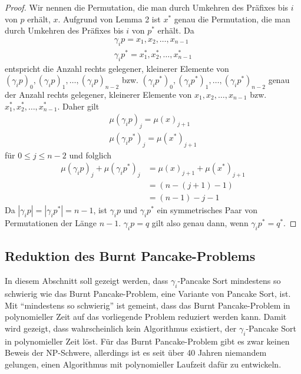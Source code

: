 \documentclass[a4paper, 10pt, ngerman]{article}
\begin{document}
\begin{proof}
    Wir nennen die Permutation, die man durch Umkehren des Präfixes bis $i$ von $p$ erhält, $x$. Aufgrund von Lemma 2 ist $x^*$ genau die Permutation, die man durch Umkehren des Präfixes bis $i$ von $p^*$ erhält.
    Da
    \begin{align*}
        \gamma_i p = x_1, x_2, \dots, x_{n-1} \\
        \gamma_i p^* = x^*_1, x^*_2, \dots, x^*_{n-1}
    \end{align*}
    entspricht die Anzahl rechts gelegener, kleinerer Elemente von $(\gamma_i p)_0, (\gamma_i p)_1, \dots, (\gamma_i p)_{n - 2}$ bzw. $(\gamma_i p^*)_0, (\gamma_i p^*)_1, \dots, (\gamma_i p^*)_{n - 2}$ genau der Anzahl rechts gelegener, kleinerer Elemente von $x_1, x_2, \dots, x_{n-1}$ bzw. $x^*_1, x^*_2, \dots, x^*_{n-1}$. Daher gilt
    \begin{align*}
        \mu(\gamma_i p)_j = \mu(x)_{j + 1} \\
        \mu(\gamma_i p^*)_j = \mu(x^*)_{j + 1}
    \end{align*}
    für $0 \le j \le n - 2$ und folglich
    \begin{align*}
        \mu(\gamma_i p)_j + \mu(\gamma_i p^*)_j & = \mu(x)_{j + 1} + \mu(x^*)_{j + 1} \\
                                                & = (n - (j + 1) - 1)                 \\
                                                & = (n - 1) - j - 1
    \end{align*}
    Da $|\gamma_i p| = |\gamma_i p^*| = n - 1$, ist $\gamma_i p$ und $\gamma_i p^*$ ein symmetrisches Paar von Permutationen der Länge $n - 1$. $\gamma_i p = q$ gilt also genau dann, wenn $\gamma_i p^* = q^*$.
\end{proof}

\subsection{Reduktion des Burnt Pancake-Problems}

In diesem Abschnitt soll gezeigt werden, dass $\gamma_i$-Pancake Sort mindestens so schwierig wie das Burnt Pancake-Problem, eine Variante von Pancake Sort, ist. Mit ``mindestens so schwierig'' ist gemeint, dass das Burnt Pancake-Problem in polynomieller Zeit auf das vorliegende Problem reduziert werden kann. Damit wird gezeigt, dass wahrscheinlich kein Algorithmus existiert, der $\gamma_i$-Pancake Sort in polynomieller Zeit löst. Für das Burnt Pancake-Problem gibt es zwar keinen Beweis der NP-Schwere, allerdings ist es seit über 40 Jahren niemandem gelungen, einen Algorithmus mit polynomieller Laufzeit dafür zu entwickeln.
\end{document}
